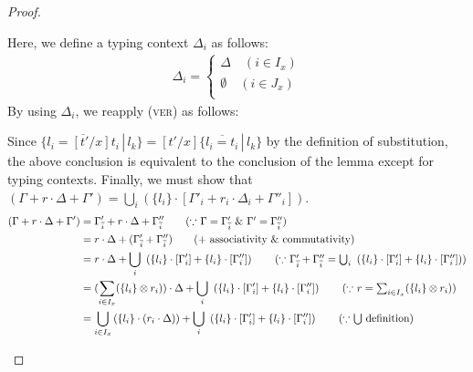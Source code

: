 \begin{proof}
\begin{itemize}
Here, we define a typing context $\Delta_i$ as follows:
\begin{align*}
\Delta_i =
\left\{
\begin{aligned}
\Delta \hspace{1em} (i\in I_x)\\
\emptyset \hspace{1em} (i\in J_x)\\
\end{aligned}
\right.
\end{align*}
By using $\Delta_i$, we reapply (\textsc{ver}) as follows:
\begin{center}
    \begin{minipage}{.8\linewidth}
    \end{minipage}
\end{center}
Since $\{\overline{l_i=[t'/x]t_i}\,|\,l_k\} = [t'/x]\{\overline{l_i=t_i}\,|\,l_k\}$ by the definition of substitution, the above conclusion is equivalent to the conclusion of the lemma except for typing contexts.
Finally, we must show that $(\Gamma + r\cdot\Delta + \Gamma') = \bigcup_i(\{l_i\}\cdot [\Gamma'_i + r_i\cdot\Delta_i + \Gamma''_i])$.
\begin{align*}
(\Gamma + r\cdot\Delta + \Gamma')
&= \Gamma'_{\overline{i}} + r\cdot\Delta + \Gamma''_{\overline{i}}\tag{$\because$ $\Gamma = \Gamma'_{\overline{i}}$ \& $\Gamma' = \Gamma''_{\overline{i}}$}\\
&= r\cdot\Delta + (\Gamma'_{\overline{i}} + \Gamma''_{\overline{i}}) \tag{$+$ associativity \& commutativity}\\
&= r\cdot\Delta + \bigcup_{i} \ \left(\{l_i\}\cdot[\Gamma'_i] + \{l_i\}\cdot[\Gamma''_i]\right) \tag{$\because$ $\Gamma'_{\overline{i}} + \Gamma''_{\overline{i}} = \bigcup_{i} \ \left(\{l_i\}\cdot[\Gamma'_i] + \{l_i\}\cdot[\Gamma''_i]\right)$}\\
&= (\sum_{i\in I_x}(\{l_i\}\otimes r_i))\cdot\Delta + \bigcup_{i} \ \left(\{l_i\}\cdot[\Gamma'_i] + \{l_i\}\cdot[\Gamma''_i]\right) \tag{$\because$ $r=\sum_{i\in I_x}(\{l_i\}\otimes r_i)$}\\
&= \bigcup_{i\in I_x}\left(\{l_i\}\cdot\left(r_i\cdot\Delta\right)\right) + \bigcup_{i} \ \left(\{l_i\}\cdot[\Gamma'_i] + \{l_i\}\cdot[\Gamma''_i]\right) \tag{$\because$ $\bigcup$ definition}\\

\end{align*}
\end{itemize}
\end{proof}
